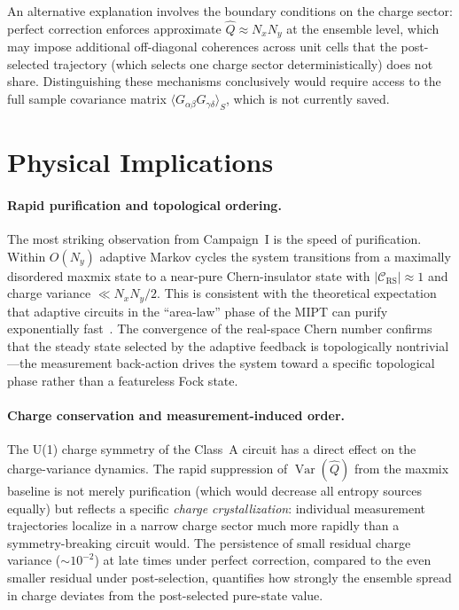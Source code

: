\documentclass[twocolumn,aps,prx,10pt,floatfix]{revtex4-2}
\begin{document}
An alternative explanation involves the boundary conditions on the charge
sector: perfect correction enforces approximate $\hat{Q} \approx N_xN_y$
at the ensemble level, which may impose additional off-diagonal coherences
across unit cells that the post-selected trajectory (which selects one
charge sector deterministically) does not share.  Distinguishing these
mechanisms conclusively would require access to the full sample covariance
matrix $\langle G_{\alpha\beta} G_{\gamma\delta}\rangle_S$, which is not
currently saved.

\section{Physical Implications}
\label{sec:implications}

\paragraph{Rapid purification and topological ordering.}
The most striking observation from Campaign~I is the speed of purification.
Within $O(N_y)$ adaptive Markov cycles the system transitions from a
maximally disordered maxmix state to a near-pure Chern-insulator state
with $|\mathcal{C}_\text{RS}|\approx 1$ and charge variance
$\ll N_xN_y/2$.  This is consistent with the theoretical expectation that
adaptive circuits in the ``area-law'' phase of the MIPT can purify
exponentially fast~\cite{Gullans2020}.  The convergence of the real-space
Chern number confirms that the steady state selected by the adaptive
feedback is topologically nontrivial---the measurement back-action drives
the system toward a specific topological phase rather than a featureless
Fock state.

\paragraph{Charge conservation and measurement-induced order.}
The U(1) charge symmetry of the Class~A circuit has a direct effect on
the charge-variance dynamics.  The rapid suppression of $\operatorname{Var}
(\hat{Q})$ from the maxmix baseline is not merely purification (which would
decrease all entropy sources equally) but reflects a specific \emph{charge
crystallization}: individual measurement trajectories localize in a narrow
charge sector much more rapidly than a symmetry-breaking circuit would.
The persistence of small residual charge variance ($\sim 10^{-2}$) at late
times under perfect correction, compared to the even smaller residual under
post-selection, quantifies how strongly the ensemble spread in charge
deviates from the post-selected pure-state value.
\end{document}
